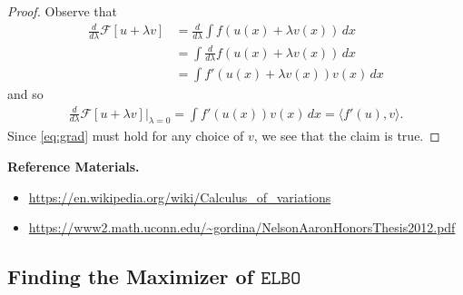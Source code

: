 \documentclass[10pt]{article}
\newcommand{\FF}{\mathcal{F}}
\newcommand{\elbo}{\texttt{ELBO}}
\begin{document}
\begin{proof}
Observe that
\begin{align*}
\frac{d}{d\lambda} \FF[u + \lambda v] &= \frac{d}{d\lambda} \int f(u(x) + \lambda v(x)) \, dx \\
&= \int \frac{d}{d\lambda} f(u(x) + \lambda v(x)) \, dx \\
&= \int f'(u(x) + \lambda v(x)) v(x) \, dx
\end{align*}
and so
\begin{align*}
\frac{d}{d\lambda} \FF[u + \lambda v] \bigg\rvert_{\lambda = 0} = \int f'(u(x)) v(x) \, dx = \langle f'(u), v \rangle.
\end{align*}
Since \eqref{eq:grad} must hold for any choice of $v$, we see that the claim is true.
\end{proof}


\textbf{Reference Materials.}
\begin{itemize}
\item \url{https://en.wikipedia.org/wiki/Calculus_of_variations}
\item \url{https://www2.math.uconn.edu/~gordina/NelsonAaronHonorsThesis2012.pdf}
\end{itemize}

\newpage

\subsection{Finding the Maximizer of $\elbo$} \label{append:varelbo}
\end{document}
